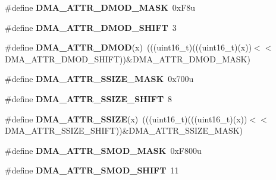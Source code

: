 \begin{DoxyCompactItemize}
\item 
\#define {\bfseries D\+M\+A\+\_\+\+A\+T\+T\+R\+\_\+\+D\+M\+O\+D\+\_\+\+M\+A\+SK}~0x\+F8u\hypertarget{group__DMA__Register__Masks_gaaa09f9ea822cc0cfe20270611cf522cc}{}\label{group__DMA__Register__Masks_gaaa09f9ea822cc0cfe20270611cf522cc}

\item 
\#define {\bfseries D\+M\+A\+\_\+\+A\+T\+T\+R\+\_\+\+D\+M\+O\+D\+\_\+\+S\+H\+I\+FT}~3\hypertarget{group__DMA__Register__Masks_gab9f08d507f579493d605780d854404d6}{}\label{group__DMA__Register__Masks_gab9f08d507f579493d605780d854404d6}

\item 
\#define {\bfseries D\+M\+A\+\_\+\+A\+T\+T\+R\+\_\+\+D\+M\+OD}(x)~(((uint16\+\_\+t)(((uint16\+\_\+t)(x))$<$$<$D\+M\+A\+\_\+\+A\+T\+T\+R\+\_\+\+D\+M\+O\+D\+\_\+\+S\+H\+I\+FT))\&D\+M\+A\+\_\+\+A\+T\+T\+R\+\_\+\+D\+M\+O\+D\+\_\+\+M\+A\+SK)\hypertarget{group__DMA__Register__Masks_ga817a104659b44c38da980ccf0ca4f594}{}\label{group__DMA__Register__Masks_ga817a104659b44c38da980ccf0ca4f594}

\item 
\#define {\bfseries D\+M\+A\+\_\+\+A\+T\+T\+R\+\_\+\+S\+S\+I\+Z\+E\+\_\+\+M\+A\+SK}~0x700u\hypertarget{group__DMA__Register__Masks_ga30f2f09fb581b8c9619414125cf3045b}{}\label{group__DMA__Register__Masks_ga30f2f09fb581b8c9619414125cf3045b}

\item 
\#define {\bfseries D\+M\+A\+\_\+\+A\+T\+T\+R\+\_\+\+S\+S\+I\+Z\+E\+\_\+\+S\+H\+I\+FT}~8\hypertarget{group__DMA__Register__Masks_ga815c285ac74667a99f2a7ce5e686641b}{}\label{group__DMA__Register__Masks_ga815c285ac74667a99f2a7ce5e686641b}

\item 
\#define {\bfseries D\+M\+A\+\_\+\+A\+T\+T\+R\+\_\+\+S\+S\+I\+ZE}(x)~(((uint16\+\_\+t)(((uint16\+\_\+t)(x))$<$$<$D\+M\+A\+\_\+\+A\+T\+T\+R\+\_\+\+S\+S\+I\+Z\+E\+\_\+\+S\+H\+I\+FT))\&D\+M\+A\+\_\+\+A\+T\+T\+R\+\_\+\+S\+S\+I\+Z\+E\+\_\+\+M\+A\+SK)\hypertarget{group__DMA__Register__Masks_gab86855f2aff624b11942ebf79dbcb1b6}{}\label{group__DMA__Register__Masks_gab86855f2aff624b11942ebf79dbcb1b6}

\item 
\#define {\bfseries D\+M\+A\+\_\+\+A\+T\+T\+R\+\_\+\+S\+M\+O\+D\+\_\+\+M\+A\+SK}~0x\+F800u\hypertarget{group__DMA__Register__Masks_ga288d7e465abd4be34477ae308a9b0982}{}\label{group__DMA__Register__Masks_ga288d7e465abd4be34477ae308a9b0982}

\item 
\#define {\bfseries D\+M\+A\+\_\+\+A\+T\+T\+R\+\_\+\+S\+M\+O\+D\+\_\+\+S\+H\+I\+FT}~11\hypertarget{group__DMA__Register__Masks_gaebf723df7b7cad164714583c0876a378}{}\label{group__DMA__Register__Masks_gaebf723df7b7cad164714583c0876a378}


\end{DoxyCompactItemize}
